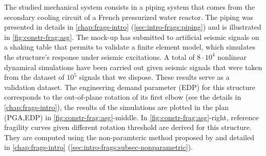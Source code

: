 The studied mechanical system consists in a piping system that comes from the secondary cooling circuit of a French pressurized water reactor.
The piping was presented in details in   \cref{chap:frags-intro} (\cref{sec:intro-frags:piping}) and is illustrated in \cref{fig:constr-frag:asg}.
The mock-up has submitted to artificial seismic signals on a shaking table that permits to validate a finite element model, which simulates the structure's response under seismic excitations.
A total of $8\cdot 10^4$ nonlinear dynamical simulations have been carried out given seismic signals that were taken from the dataset of $10^5$ signals that we dispose. These results serve as a validation dataset. 
The engineering demand parameter (EDP) for this structure corresponds to the out-of-plane rotation of its first elbow (see the details in   \cref{chap:frags-intro}), the results of the simulations are plotted in the plan (PGA,EDP) in \cref{fig:constr-frag:asg}-middle.
In \cref{fig:constr-frag:asg}-right, reference fragility curves given different rotation threshold are derived for this structure. They are computed using the non-paramteric method proposed by \citet{trevlopoulos_parametric_2019} and detailed in   \cref{chap:frags-intro} (\cref{sec:intro-frags:subsec-nonparametric}).






